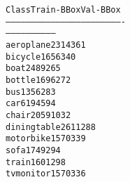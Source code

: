 \documentclass[letterpaper,10pt,english]{/usr/share/sphinx/texinputs/sphinxhowto}
\newenvironment{InvisibleVerbatim}
        {\begin{mdframed}[leftmargin=0.1\linewidth,innerleftmargin=3pt,innerrightmargin=3pt, userdefinedwidth=1\linewidth, linewidth=0pt, linecolor=white, usetwoside=false]}
        {\end{mdframed}}
\begin{document}
    

        
        

            
                \begin{InvisibleVerbatim}
                \vspace{-0.5\baselineskip}
\begin{alltt}Class        Train-BBox           Val-BBox
----------------------------------------------------------------------
------------------------------
aeroplane    2314                 361
bicycle      1656                 340
boat         2489                 265
bottle       1696                 272
bus          1356                 283
car          6194                 594
chair        2059                 1032
diningtable  2611                 288
motorbike    1570                 339
sofa         1749                 294
train        1601                 298
tvmonitor    1570                 336
\end{alltt}

            \end{InvisibleVerbatim}
            
        
    


\end{document}
